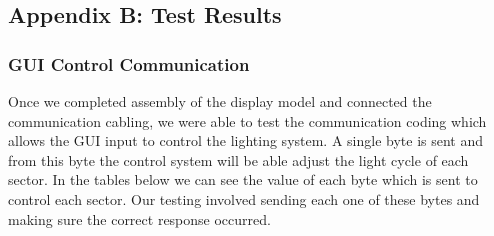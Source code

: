 \documentclass[12pt,a4paper]{report}
\begin{document}
\subsection{Appendix B: Test Results}

\subsubsection{GUI Control Communication}
Once we completed assembly of the display model and connected the communication cabling, we were able to test the communication coding which allows the GUI input to control the lighting system. A single byte is sent and from this byte the control system will be able adjust the light cycle of each sector. In the tables below we can see the value of each byte which is sent to control each sector. Our testing involved sending each one of these bytes and making sure the correct response occurred.
\end{document}
